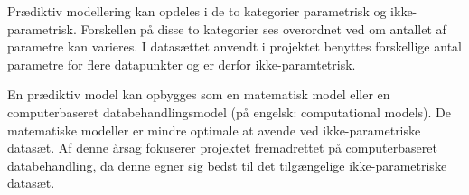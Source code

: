 \noindent
Prædiktiv modellering kan opdeles i de to kategorier parametrisk og ikke-parametrisk. Forskellen på disse to kategorier ses overordnet ved om antallet af parametre kan varieres. I datasættet anvendt i projektet benyttes forskellige antal parametre for flere datapunkter og er derfor ikke-paramtetrisk.\cite{Sheskin2000}

\noindent
En prædiktiv model kan opbygges som en matematisk model eller en computerbaseret databehandlingsmodel (på engelsk: computational models). De matematiske modeller er mindre optimale at avende ved ikke-parametriske datasæt. Af denne årsag fokuserer projektet fremadrettet på computerbaseret databehandling, da denne egner sig bedst til det tilgængelige ikke-parametriske datasæt. \cite{Sheskin2000} 
